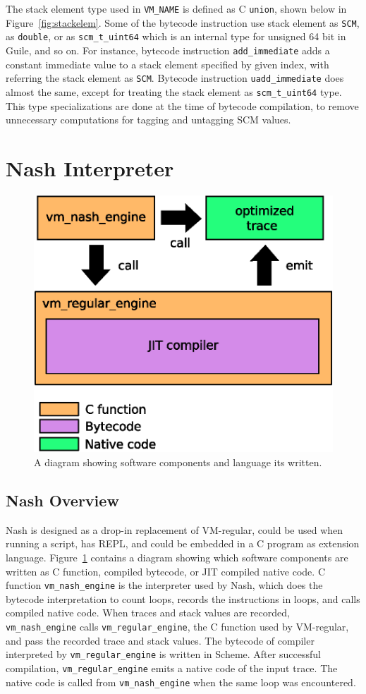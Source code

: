 \documentclass[preprint, 10pt]{sigplanconf}
\begin{document}
The stack element type used in \texttt{VM\_NAME} is defined as C \texttt{union},
shown below in Figure~\hyperref[fig:stackelem]{\ref{fig:stackelem}}. Some of the
bytecode instruction use stack element as \texttt{SCM}, as \texttt{double}, or
as \texttt{scm\_t\_uint64} which is an internal type for unsigned 64 bit in
Guile, and so on. For instance, bytecode instruction \texttt{add\_immediate}
adds a constant immediate value to a stack element specified by given index,
with referring the stack element as \texttt{SCM}. Bytecode instruction
\texttt{uadd\_immediate} does almost the same, except for treating the stack
element as \texttt{scm\_t\_uint64} type. This type specializations are done at
the time of bytecode compilation, to remove unnecessary computations for tagging
and untagging SCM values.

\section{Nash Interpreter}
\label{sec:interpreter}

\begin{figure}
  \centering
  \includegraphics[width=0.4 \textwidth]{overview}
  \caption{A diagram showing software components and language its written.}
\label{fig:overview}
\end{figure}

\subsection{Nash Overview}

Nash is designed as a drop-in replacement of VM-regular, could be used when
running a script, has REPL, and could be embedded in a C program as extension
language. Figure~\hyperref[fig:overview]{\ref{fig:overview}} contains a diagram
showing which software components are written as C function, compiled bytecode,
or JIT compiled native code. C function \texttt{vm\_nash\_engine} is the
interpreter used by Nash, which does the bytecode interpretation to count loops,
records the instructions in loops, and calls compiled native code. When traces
and stack values are recorded, \texttt{vm\_nash\_engine} calls
\texttt{vm\_regular\_engine}, the C function used by VM-regular, and pass the
recorded trace and stack values. The bytecode of compiler interpreted by
\texttt{vm\_regular\_engine} is written in Scheme. After successful compilation,
\texttt{vm\_regular\_engine} emits a native code of the input trace. The native
code is called from \texttt{vm\_nash\_engine} when the same loop was
encountered.
\end{document}
